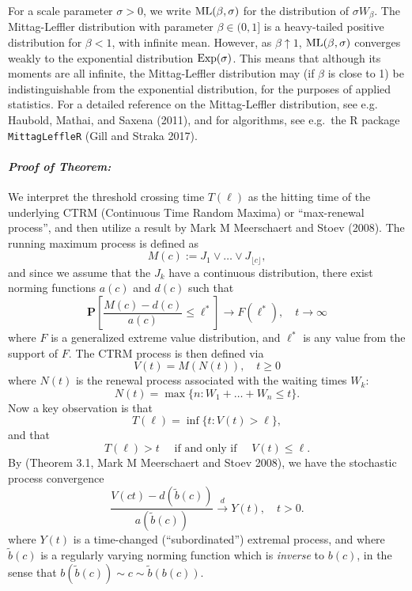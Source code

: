 \documentclass[smallextended]{svjour3}       %
\begin{document}
\noindent For a scale parameter \(\sigma > 0\), we write
\({\rm ML}(\beta, \sigma)\) for the distribution of \(\sigma W_\beta\).
The Mittag-Leffler distribution with parameter \(\beta \in (0,1]\) is a
heavy-tailed positive distribution for \(\beta < 1\), with infinite
mean. However, as \(\beta \uparrow 1\), \({\rm ML}(\beta, \sigma)\)
converges weakly to the exponential distribution \({\rm Exp}(\sigma)\).
This means that although its moments are all infinite, the
Mittag-Leffler distribution may (if \(\beta\) is close to 1) be
indistinguishable from the exponential distribution, for the purposes of
applied statistics. For a detailed reference on the Mittag-Leffler
distribution, see e.g. Haubold, Mathai, and Saxena (2011), and for
algorithms, see e.g.~the R package \texttt{MittagLeffleR} (Gill and
Straka 2017).

\paragraph{\texorpdfstring{\emph{Proof of
Theorem:}}{Proof of Theorem:}}\label{proof-of-theorem}

We interpret the threshold crossing time \(T(\ell)\) as the hitting time
of the underlying CTRM (Continuous Time Random Maxima) or ``max-renewal
process'', and then utilize a result by Mark M Meerschaert and Stoev
(2008). The running maximum process is defined as \[
M(c) := J_1 \vee \ldots \vee J_{\lfloor c \rfloor},
\] and since we assume that the \(J_k\) have a continuous distribution,
there exist norming functions \(a(c)\) and \(d(c)\) such that \[
\mathbf P\left[ \frac{M(c) - d(c)}{a(c)} \le \ell^* \right] 
\longrightarrow F(\ell^*), \quad t \to \infty
\] where \(F\) is a generalized extreme value distribution, and
\(\ell^*\) is any value from the support of \(F\). The CTRM process is
then defined via \[
V(t) = M(N(t)), \quad t \ge 0
\] where \(N(t)\) is the renewal process associated with the waiting
times \(W_k\): \[
N(t) = \max\{n: W_1 + \ldots + W_n \le t\}.
\] Now a key observation is that \[
T(\ell) = \inf\{t: V(t) > \ell\}, 
\] and that \[
T(\ell) > t \quad \text{ if and only if } \quad V(t) \le \ell.
\] By (Theorem 3.1, Mark M Meerschaert and Stoev 2008), we have the
stochastic process convergence \[
\frac{V(ct) - d(\tilde b(c))}{a(\tilde b(c))} 
\stackrel{d}{\longrightarrow} Y(t), \quad t > 0.
\] where \(Y(t)\) is a time-changed (``subordinated'') extremal process,
and where \(\tilde b(c)\) is a regularly varying norming function which
is \emph{inverse} to \(b(c)\), in the sense that
\(b(\tilde b(c)) \sim c \sim \tilde b(b(c))\).
\end{document}
